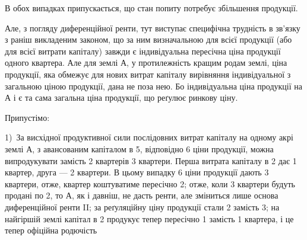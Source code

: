 В обох випадках припускається, що стан попиту потребує збільшення
продукції.

Але, з погляду диференційної ренти, тут виступає специфічна трудність
в зв’язку з раніш викладеним законом, що за ним визначальною для всієї продукції
(або для всієї витрати капіталу) завжди є індивідуальна пересічна ціна
продукції одного квартера. Але для землі $А$, у протилежність кращим родам
землі, ціна продукції, яка обмежує для нових витрат капіталу вирівняння індивідуальної
з загальною ціною продукції, дана не поза нею. Бо індивідуальна ціна
продукції на $А$ і є та сама загальна ціна продукції, що реґулює ринкову ціну.

Припустімо:

1)~За висхідної продуктивної сили послідовних витрат
капіталу на одному акрі землі $А$, з авансованим капіталом в 5,
відповідно 6 ціни продукції, можна випродукувати замість 2 квартерів
3 квартери. Перша витрата капіталу в 2 дає 1 квартер, друга — 2 квартери. В цьому
випадку 6 ціни продукції дають 3 квартери,
отже, квартер коштуватиме пересічно 2; отже, коли 3 квартери
будуть продані по 2, то $А$, як і давніш, не дасть ренти, але зміниться
лише основа диференційної ренти II; за реґуляційну ціну продукції стали
2 замість 3; на найгіршій землі капітал в 2
продукує тепер пересічно 1  замість 1 квартера, і це тепер офіційна родючість
\parbreak{}  %
